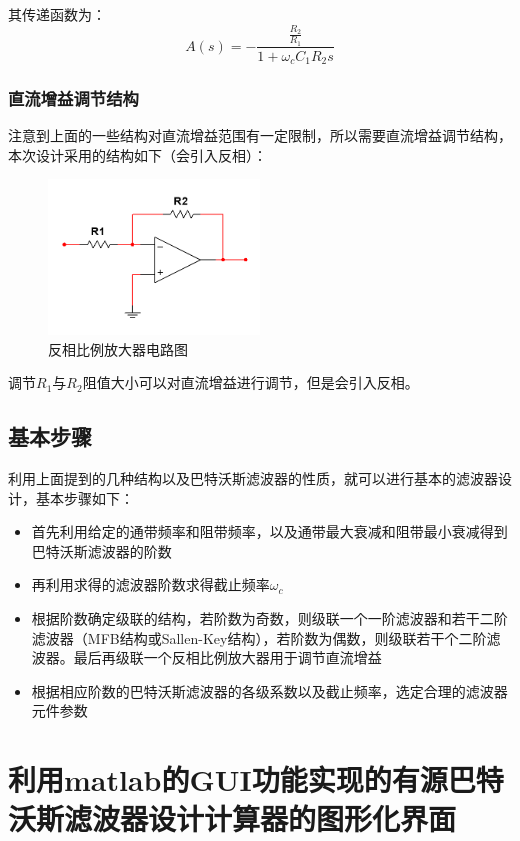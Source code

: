 \documentclass[UTF8]{ctexart}
\begin{document}
其传递函数为：
\begin{equation}
A(s)=-\frac{\frac{R_2}{R_1}}{1+\omega_cC_1R_2s}
\end{equation}

\subsubsection{直流增益调节结构}
注意到上面的一些结构对直流增益范围有一定限制，所以需要直流增益调节结构，本次设计采用的结构如下（会引入反相）：
\begin{figure}[H]
\centering
\includegraphics[width=0.5\textwidth]{6.png}
\caption{反相比例放大器电路图}
\end{figure}

调节$R_1$与$R_2$阻值大小可以对直流增益进行调节，但是会引入反相。

\subsection{基本步骤}
利用上面提到的几种结构以及巴特沃斯滤波器的性质，就可以进行基本的滤波器设计，基本步骤如下：

\begin{itemize}
\item 首先利用给定的通带频率和阻带频率，以及通带最大衰减和阻带最小衰减得到巴特沃斯滤波器的阶数
\item 再利用求得的滤波器阶数求得截止频率$\omega_c$
\item 根据阶数确定级联的结构，若阶数为奇数，则级联一个一阶滤波器和若干二阶滤波器（MFB结构或Sallen-Key结构），若阶数为偶数，则级联若干个二阶滤波器。最后再级联一个反相比例放大器用于调节直流增益
\item 根据相应阶数的巴特沃斯滤波器的各级系数以及截止频率，选定合理的滤波器元件参数
\end{itemize}
\section{利用matlab的GUI功能实现的有源巴特沃斯滤波器设计计算器的图形化界面}
\end{document}
